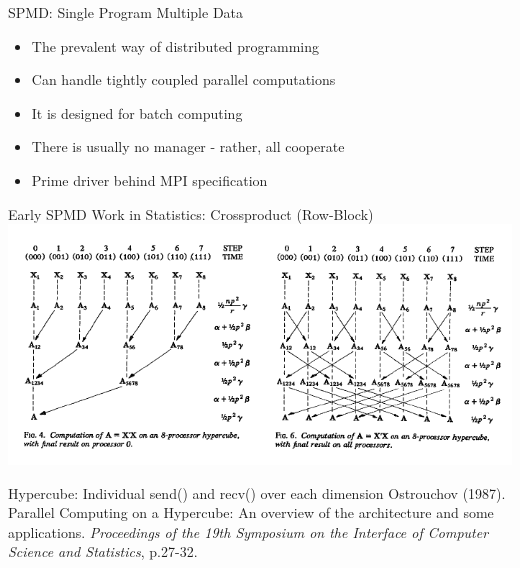 \begin{frame}{SPMD: Single Program Multiple Data}
  \begin{block}{}
    \begin{itemize}
    \item The prevalent way of distributed programming
    \item Can handle tightly coupled parallel computations
    \item It is designed for batch computing
    \item There is usually no manager - rather, all cooperate
    \item Prime driver behind MPI specification
    \end{itemize}
  \end{block}
\end{frame}

\begin{frame}{Early SPMD Work in Statistics: Crossproduct (Row-Block)}
  \includegraphics[width=\textwidth]
  {../common/pics/comm/Crossprod1987.png} \\
  \begin{block}{Hypercube: Individual send() and recv() over each dimension}
    {\scriptsize Ostrouchov (1987). Parallel Computing on a
      Hypercube: An overview of the architecture and some
      applications. {\em Proceedings of the 19th Symposium on the
        Interface of Computer Science and Statistics}, p.27-32.}
  \end{block}
\end{frame}

